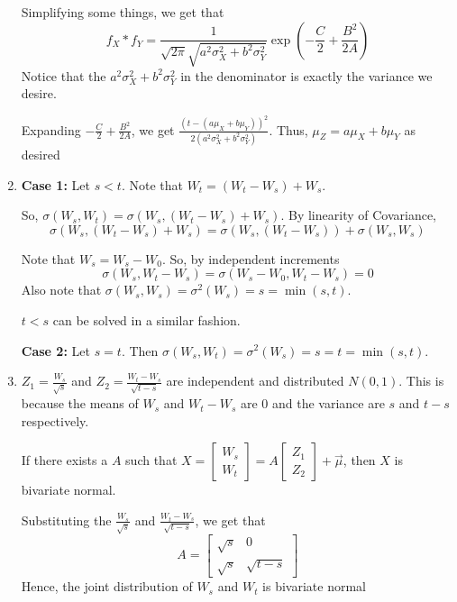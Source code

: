 \documentclass[12pt]{article}
\begin{document}
\begin{enumerate}[start=1,label={\bfseries Problem \arabic*:},leftmargin=1in]
    Simplifying some things, we get that 
    \[ 
    f_X \ast f_Y = \frac{1}{\sqrt{2\pi} \sqrt{a^2\sigma_X^2 + b^2\sigma_Y^2}} \exp(-\frac{C}{2} + \frac{B^2}{2A})
    \]
    Notice that the $a^2\sigma_X^2 + b^2\sigma_Y^2$ in the denominator is exactly the variance we desire. 
    
    Expanding $-\frac{C}{2} + \frac{B^2}{2A}$, we get $\frac{(t - (a\mu_X + b\mu_Y))^2}{2(a^2\sigma_X^2 + b^2\sigma_Y^2)}$. Thus, $\mu_Z = a\mu_X + b\mu_Y$ as desired

    \item \textbf{Case 1:} Let $s < t$. Note that $W_t = (W_t - W_s) + W_s$. 
    
    So, $\sigma(W_s, W_t) = \sigma(W_s, (W_t - W_s) + W_s)$. By linearity of Covariance, 
    \[ 
        \sigma(W_s, (W_t - W_s) + W_s) = \sigma(W_s, (W_t - W_s)) + \sigma(W_s, W_s) 
    \]
       
    Note that $W_s = W_s - W_0$. So, by independent increments 
    \[
        \sigma(W_s, W_t - W_s) = \sigma(W_s - W_0, W_t - W_s) =  0  
    \]
    Also note that $\sigma(W_s, W_s) = \sigma^2(W_s) = s = \min(s, t)$.

    $t < s$ can be solved in a similar fashion.

    \textbf{Case 2:} Let $s = t$. Then $\sigma(W_s, W_t) = \sigma^2(W_s) = s = t = \min(s, t)$.

    \item  $Z_1 = \frac{W_s}{\sqrt{s}}$ and $Z_2 = \frac{W_t - W_s}{\sqrt{t-s}}$ are independent and distributed $N(0, 1)$. 
    This is because the means of $W_s$ and $W_t - W_s$ are $0$ and the variance are $s$ and $t- s$ respectively. 

    If there exists a $A$ such that $X = \begin{bmatrix}
        W_s \\ W_t
    \end{bmatrix} = A\begin{bmatrix}
        Z_1 \\ Z_2
    \end{bmatrix} + \vec{\mu}$, then $X$ is bivariate normal. 

    Substituting the $\frac{W_s}{\sqrt{s}}$ and $\frac{W_t - W_s}{\sqrt{t-s}}$,  we get that 
    \[
        A = \begin{bmatrix}
            \sqrt{s} & 0 \\ 
            \sqrt{s} & \sqrt{t - s}
        \end{bmatrix}
    \]
    Hence, the joint distribution of $W_s$ and $W_t$ is bivariate normal 


\end{enumerate}
\end{document}
